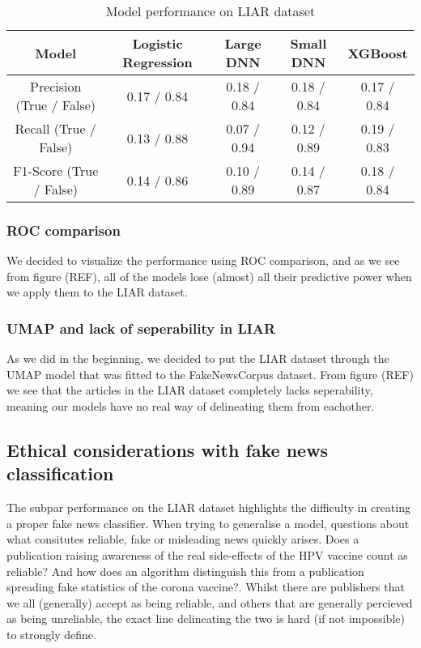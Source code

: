 \begin{table}[htpb]
  \centering
  \caption{Model performance on LIAR dataset}
  \label{tab:liarperformance}
  \begin{tabular}{c|cccc}
    Model & Logistic Regression & Large DNN & Small DNN & XGBoost \\ \hline
    Precision (True / False) & 0.17 / 0.84  & 0.18 / 0.84 & 0.18 / 0.84 & 0.17 / 0.84 \\ \hline
    Recall (True / False) & 0.13 / 0.88 & 0.07 / 0.94 & 0.12 / 0.89 & 0.19 / 0.83 \\ \hline
    F1-Score (True / False) & 0.14 / 0.86 & 0.10 / 0.89 & 0.14 / 0.87 & 0.18 / 0.84 \\ \hline
  \end{tabular}
\end{table}

\subsubsection{ROC comparison}
We decided to visualize the performance using ROC comparison, and as we see from figure (REF), all of the models lose
(almost) all their predictive power when we apply them to the LIAR dataset.


\subsubsection{UMAP and lack of seperability in LIAR}
As we did in the beginning, we decided to put the LIAR dataset through the UMAP model that was fitted to the
FakeNewsCorpus dataset. From figure (REF) we see that the articles in the LIAR dataset completely lacks seperability,
meaning our models have no real way of delineating them from eachother.


\subsection{Ethical considerations with fake news classification}
The subpar performance on the LIAR dataset highlights the difficulty in creating a proper fake news classifier. When trying to
generalise a model, questions about what consitutes reliable, fake or misleading news quickly arises. Does a publication raising awareness
of the real side-effects of the HPV vaccine count as reliable? And how does an algorithm distinguish this from a
publication spreading fake statistics of the corona vaccine?. Whilst there are publishers that we all (generally)
accept as being reliable, and others that are generally percieved as being unreliable, the exact line delineating the
two is hard (if not impossible) to strongly define.
